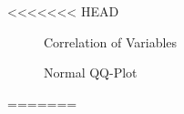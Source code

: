 \documentclass[12pt]{article}
\begin{document}
\begin{enumerate}
<<<<<<< HEAD
		\begin{figure}[h!]
		\centering
		\begin{minipage}{0.48\textwidth}
			\caption{Correlation of Variables} 
			\label{fig:corplot}
		\end{minipage}
		\hfill %
		\centering
		\begin{minipage}{0.48\textwidth}
			\centering
			\caption{Normal QQ-Plot} 
			\label{fig:qqplot}
		\end{minipage}
	\end{figure}
=======
	
	
		
		
		
		
		
	

\end{enumerate}
\end{document}
